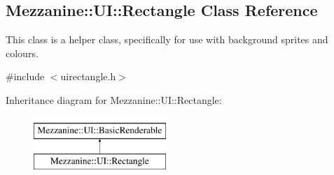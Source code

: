 \hypertarget{classMezzanine_1_1UI_1_1Rectangle}{
\subsection{Mezzanine::UI::Rectangle Class Reference}
\label{classMezzanine_1_1UI_1_1Rectangle}
}


This class is a helper class, specifically for use with background sprites and colours.  




{\ttfamily \#include $<$uirectangle.h$>$}

Inheritance diagram for Mezzanine::UI::Rectangle:\begin{figure}[H]
\begin{center}
\leavevmode
\includegraphics[height=2.000000cm]{classMezzanine_1_1UI_1_1Rectangle}
\end{center}
\end{figure}
